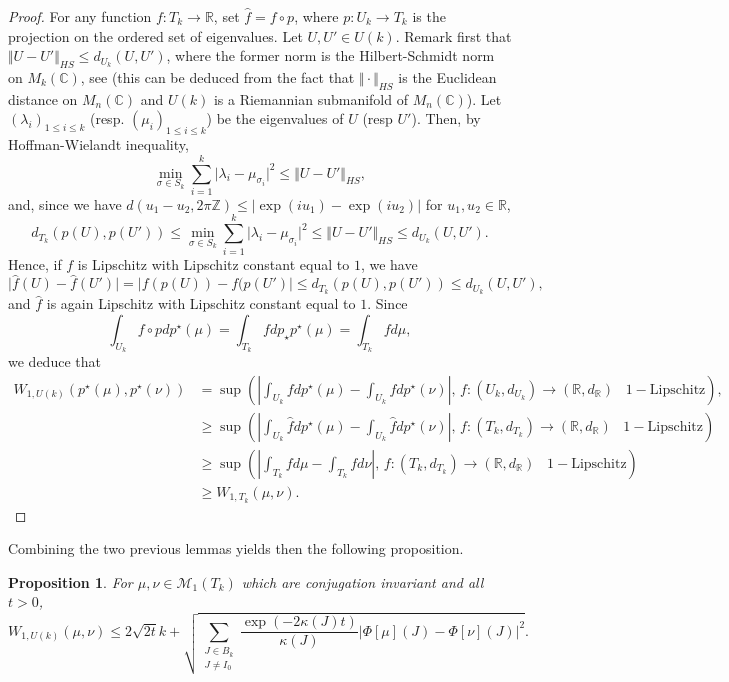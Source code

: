 \documentclass[10pt,11pt]{amsart}%
\newtheorem{proposition}[theorem]{Proposition}
\begin{document}
\begin{proof}
For any function $f: T_{k}\rightarrow\mathbb{R}$, set $\hat{f}=f\circ p$, where $p:U_k\rightarrow  T_{k}$ is the projection on the ordered set of eigenvalues. Let $U,U'\in U(k)$. Remark first that $\Vert U-U'\Vert_{HS}\leq d_{U_k}(U,U')$, where the former norm is the Hilbert-Schmidt norm on $M_k(\mathbb{C})$, see \cite[Lemma 1.3]{Meck} (this can be deduced from the fact that $\Vert \cdot\Vert_{HS}$ is the Euclidean distance on $M_{n}(\mathbb{C})$ and $U(k)$ is a Riemannian submanifold of $M_n(\mathbb{C})$). Let $(\lambda_i)_{1\leq i\leq k}$ (resp. $(\mu_i)_{1\leq i\leq k}$) be the eigenvalues of $U$ (resp $U'$). Then, by Hoffman-Wielandt inequality,
$$\min_{\sigma \in S_{k}} \sum_{i=1}^k\vert \lambda_i-\mu_{\sigma_i}\vert^2\leq \Vert U-U'\Vert_{HS},$$
and, since we have $d(u_1-u_2,2\pi\mathbb{Z})\leq \vert \exp(i u_1)-\exp(iu_2)\vert$ for $u_1,u_2\in \mathbb{R}$,
$$d_{ T_{k}}(p(U),p(U'))\leq \min_{\sigma \in S_{k}} \sum_{i=1}^k\vert \lambda_i-\mu_{\sigma_i}\vert^2\leq \Vert U-U'\Vert_{HS}\leq d_{U_k}(U,U').$$
Hence, if $f$ is Lipschitz with Lipschitz constant equal to $1$, we have 
$$\vert \hat{f}(U)-\hat{f}(U')\vert=\vert f(p(U))-f(p(U')\vert\leq d_{T_k}(p(U),p(U'))\leq d_{U_k}(U,U'),$$
and $\hat{f}$ is again Lipschitz with Lipschitz constant equal to $1$. Since 
$$\int_{U_k}f\circ pdp^{\star}(\mu)=\int_{ T_{k}}fdp_{\star} p^{\star}(\mu)=\int_{ T_{k}}fd\mu,$$
we deduce that 
\begin{align*}
W_{1,U(k)}(p^{\star}(\mu),p^{\star}(\nu))&=\sup\left(\left\vert \int_{U_k}f dp^{\star}(\mu) -\int_{U_k}f dp^{\star}(\nu)\right\vert, \, f: (U_k,d_{U_k})\rightarrow(\mathbb{R},d_{\mathbb{R}}) \,\text{ $1-$Lipschitz}\right),\\
&\geq \sup\left(\left\vert \int_{U_k}\hat{f} dp^{\star}(\mu) -\int_{U_k}\hat{f} dp^{\star}(\nu)\right\vert, \, f: ( T_{k},d_{ T_{k}})\rightarrow(\mathbb{R},d_{\mathbb{R}}) \,\text{ $1-$Lipschitz}\right)\\
&\geq \sup\left(\left\vert \int_{ T_{k}}f d\mu -\int_{ T_{k}}f d\nu\right\vert, \, f: ( T_{k},d_{ T_{k}})\rightarrow(\mathbb{R},d_{\mathbb{R}}) \,\text{ $1-$Lipschitz}\right)\\
&\geq W_{1, T_{k}}(\mu,\nu).
\end{align*}
\end{proof}
Combining the two previous lemmas yields then the following proposition.
\begin{proposition}\label{prop:Ledoux_approach}
For $\mu,\nu\in\mathcal{M}_1(T_k)$ which are conjugation invariant and all $t>0$,
$$W_{1, U(k)}(\mu,\nu)\leq 2\sqrt{2t}k+\sqrt{\sum_{\substack{J\in B_{k}\\J\not=I_0}}\frac{\exp(-2\kappa(J)t)}{\kappa(J)}\left\vert \Phi[\mu](J)-\Phi[\nu](J)\right\vert^2}.$$
\end{proposition}
\end{document}
